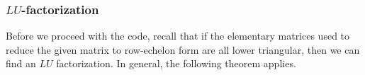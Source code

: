\documentclass{ximera}
\begin{document}
    
    
    
    
    

    \subsubsection*{$LU$-factorization}
    
    Before we proceed with the code, recall that if the elementary matrices used to reduce the given matrix to row-echelon form are all lower triangular, then we can find an $LU$ factorization.  In general, the following theorem applies.
\end{document}
